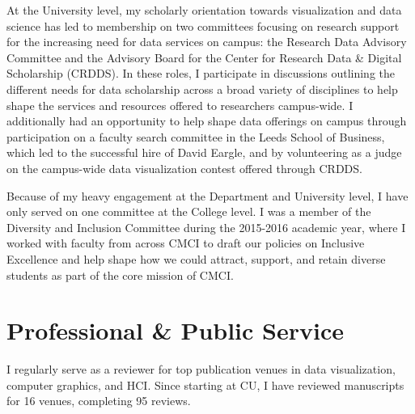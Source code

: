 \documentclass[11pt]{article}
\begin{document}

At the University level, my scholarly orientation towards visualization and data science has led to membership on two committees focusing on research support for the increasing need for data services on campus: the Research Data Advisory Committee and the Advisory Board for the Center for Research Data \& Digital Scholarship (CRDDS). In these roles, I participate in discussions outlining the different needs for data scholarship across a broad variety of disciplines to help shape the services and resources offered to researchers campus-wide. I additionally had an opportunity to help shape data offerings on campus through participation on a faculty search committee in the Leeds School of Business, which led to the successful hire of David Eargle, and by volunteering as a judge on the campus-wide data visualization contest offered through CRDDS. 

Because of my heavy engagement at the Department and University level, I have only served on one committee at the College level. I was a member of the Diversity and Inclusion Committee during the 2015-2016 academic year, where I worked with faculty from across CMCI to draft our policies on Inclusive Excellence and help shape how we could attract, support, and retain diverse students as part of the core mission of CMCI.


\section*{Professional \& Public Service}
I regularly serve as a reviewer for top publication venues in data visualization, computer graphics, and HCI. Since starting at CU, I have reviewed manuscripts for 16 venues, completing 95 reviews. 
\end{document}
